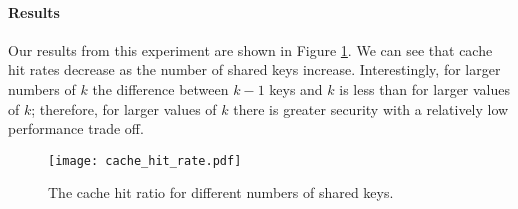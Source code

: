 \paragraph{Results}
Our results from this experiment are shown in Figure \ref{fig:cache_hits}.  We can see that cache hit rates decrease 
as the number of shared keys increase.  Interestingly, for larger numbers of $k$ the difference between $k-1$ keys and $k$ is less than for larger 
values of $k$; therefore, for larger values of $k$ there is greater security with a relatively low performance trade off.

\begin{figure}[t]
\centering
\texttt{[image: cache\_hit\_rate.pdf]}
\caption{The cache hit ratio for different numbers of shared keys.}
\label{fig:cache_hits}
\end{figure}
